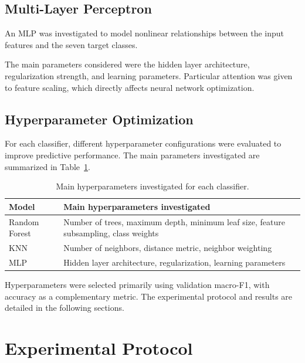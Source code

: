 \documentclass[10pt,a4paper]{article}
\begin{document}
\subsection{Multi-Layer Perceptron}

An MLP was investigated to model nonlinear relationships
between the input features and the seven target classes.

The main parameters considered were the hidden layer
architecture, regularization strength, and learning
parameters. Particular attention was given to feature
scaling, which directly affects neural network optimization.


\subsection{Hyperparameter Optimization}

For each classifier, different hyperparameter configurations
were evaluated to improve predictive performance.
The main parameters investigated are summarized in
Table~\ref{tab:hyperparameters}.

\begin{table}[H]
\centering
\small
\begin{tabularx}{\linewidth}{@{}lX@{}}
\toprule
Model & Main hyperparameters investigated\\
\midrule
Random Forest &
Number of trees, maximum depth, minimum leaf size,
feature subsampling, class weights\\

KNN &
Number of neighbors, distance metric,
neighbor weighting\\

MLP &
Hidden layer architecture, regularization,
learning parameters\\
\bottomrule
\end{tabularx}
\caption{Main hyperparameters investigated for each classifier.}
\label{tab:hyperparameters}
\end{table}

Hyperparameters were selected primarily using validation
macro-F1, with accuracy as a complementary metric.
The experimental protocol and results are detailed in
the following sections.



\section{Experimental Protocol}
\label{sec:experimental_protocol}
\end{document}
